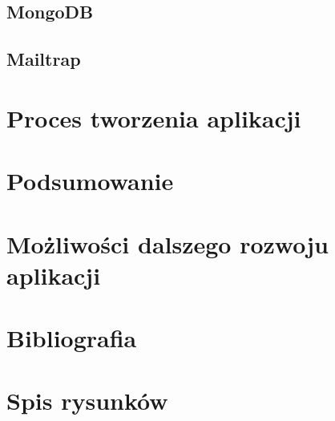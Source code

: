 \documentclass[12pt]{article}
\begin{document}
\begin{sloppypar}
{{}
\subsection{MongoDB}
{

}
\subsection{Mailtrap}
{

}
}

\section{Proces tworzenia aplikacji}
{

}

\section{Podsumowanie}
{

}

\section{Możliwości dalszego rozwoju aplikacji}
{

}

\section{Bibliografia}
{
  \printbibliography
}

\section{Spis rysunków}
{

}

\end{sloppypar}
\end{document}
